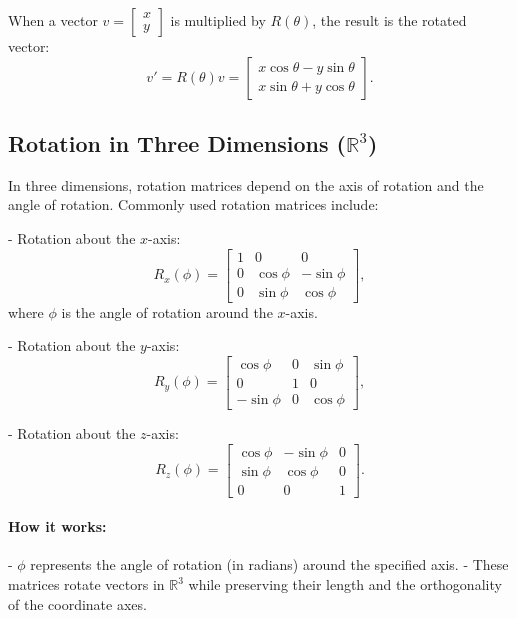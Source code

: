 \documentclass{article}
\begin{document}
When a vector $v = \begin{bmatrix} x \\ y \end{bmatrix}$ is multiplied by $R(\theta)$, the result is the rotated vector:
\[v' = R(\theta) v = \begin{bmatrix}
x \cos \theta - y \sin \theta \\
x \sin \theta + y \cos \theta
\end{bmatrix}.\]

\subsection*{Rotation in Three Dimensions ($\mathbb{R}^3$)}
In three dimensions, rotation matrices depend on the axis of rotation and the angle of rotation. Commonly used rotation matrices include:

- Rotation about the $x$-axis:
\[R_x(\phi) = \begin{bmatrix}
1 & 0 & 0 \\
0 & \cos \phi & -\sin \phi \\
0 & \sin \phi & \cos \phi
\end{bmatrix},\]
where $\phi$ is the angle of rotation around the $x$-axis.

- Rotation about the $y$-axis:
\[R_y(\phi) = \begin{bmatrix}
\cos \phi & 0 & \sin \phi \\
0 & 1 & 0 \\
-\sin \phi & 0 & \cos \phi
\end{bmatrix},\]

- Rotation about the $z$-axis:
\[R_z(\phi) = \begin{bmatrix}
\cos \phi & -\sin \phi & 0 \\
\sin \phi & \cos \phi & 0 \\
0 & 0 & 1
\end{bmatrix}.\]

\paragraph{How it works:}
- $\phi$ represents the angle of rotation (in radians) around the specified axis.
- These matrices rotate vectors in $\mathbb{R}^3$ while preserving their length and the orthogonality of the coordinate axes.
\end{document}
